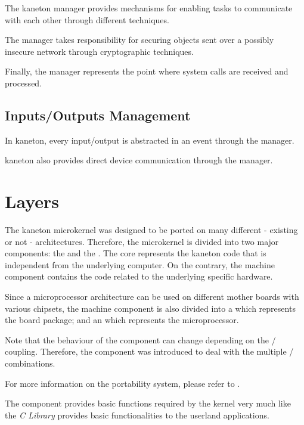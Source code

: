 The kaneton  manager provides mechanisms for enabling tasks
to communicate with each other through different techniques.

The  manager takes responsibility for securing objects
sent over a possibly insecure network through cryptographic techniques.

Finally, the  manager represents the point where system
calls are received and processed.


\subsection*{Inputs/Outputs Management}

In kaneton, every input/output is abstracted in an event through the
 manager.

kaneton also provides direct device communication through the 
manager.

%
%

\section{Layers}

The kaneton microkernel was designed to be ported on many different - existing
or not - architectures. Therefore, the microkernel is divided into two
major components: the  and the . The core
represents the kaneton code that is independent from the underlying
computer. On the contrary, the machine component contains the code
related to the underlying specific hardware.

Since a microprocessor architecture can be used on different mother boards
with various chipsets, the machine component is also divided into a
 which represents the board package; and an
 which represents the microprocessor.

Note that the behaviour of the  component can change depending
on the / coupling. Therefore, the
 component was introduced to deal with the multiple
/ combinations.

For more information on the portability system, please refer to
.

The  component provides basic functions required by the kernel
very much like the \textit{C Library} provides basic functionalities to the
userland applications.

